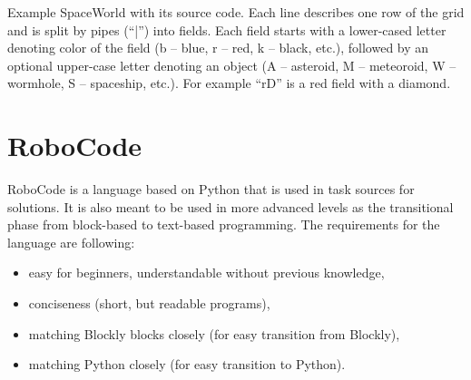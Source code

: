 

%
{Example SpaceWorld with its source code.
Each line describes one row of the grid
and is split by pipes (``|'') into fields.
Each field starts with a lower-cased letter denoting color of the field
(b -- blue, r -- red, k -- black, etc.),
followed by an optional upper-case letter denoting an object
(A -- asteroid, M -- meteoroid, W -- wormhole, S -- spaceship, etc.).
For example ``rD'' is a red field with a diamond.}



\section{RoboCode}

RoboCode is a language based on Python that is used in task sources for solutions.
It is also meant to be used in more advanced levels as the transitional phase
from block-based to text-based programming.
The requirements for the language are following:
\begin{itemize}
\item easy for beginners, understandable without previous knowledge,
\item conciseness (short, but readable programs),
\item matching Blockly blocks closely (for easy transition from Blockly),
\item matching Python closely (for easy transition to Python).
\end{itemize}

